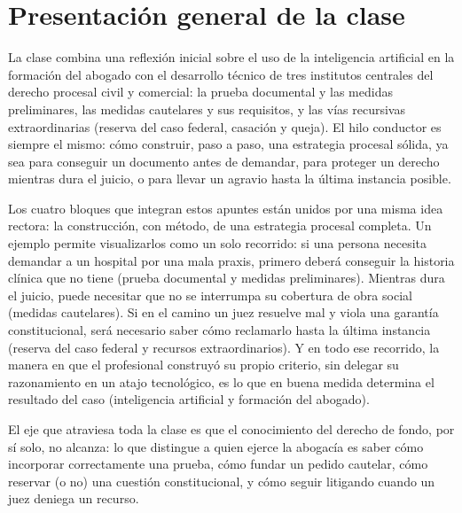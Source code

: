 \documentclass[12pt,oneside]{book}
\begin{document}
\tableofcontents

\chapter*{Presentación general de la clase}

La clase combina una reflexión inicial sobre el uso de la inteligencia artificial en la formación del abogado con el desarrollo técnico de tres institutos centrales del derecho procesal civil y comercial: la prueba documental y las medidas preliminares, las medidas cautelares y sus requisitos, y las vías recursivas extraordinarias (reserva del caso federal, casación y queja). El hilo conductor es siempre el mismo: cómo construir, paso a paso, una estrategia procesal sólida, ya sea para conseguir un documento antes de demandar, para proteger un derecho mientras dura el juicio, o para llevar un agravio hasta la última instancia posible.

Los cuatro bloques que integran estos apuntes están unidos por una misma idea rectora: la construcción, con método, de una estrategia procesal completa. Un ejemplo permite visualizarlos como un solo recorrido: si una persona necesita demandar a un hospital por una mala praxis, primero deberá conseguir la historia clínica que no tiene (prueba documental y medidas preliminares). Mientras dura el juicio, puede necesitar que no se interrumpa su cobertura de obra social (medidas cautelares). Si en el camino un juez resuelve mal y viola una garantía constitucional, será necesario saber cómo reclamarlo hasta la última instancia (reserva del caso federal y recursos extraordinarios). Y en todo ese recorrido, la manera en que el profesional construyó su propio criterio, sin delegar su razonamiento en un atajo tecnológico, es lo que en buena medida determina el resultado del caso (inteligencia artificial y formación del abogado).

\begin{important}
El eje que atraviesa toda la clase es que el conocimiento del derecho de fondo, por sí solo, no alcanza: lo que distingue a quien ejerce la abogacía es saber cómo incorporar correctamente una prueba, cómo fundar un pedido cautelar, cómo reservar (o no) una cuestión constitucional, y cómo seguir litigando cuando un juez deniega un recurso.
\end{important}
\end{document}
